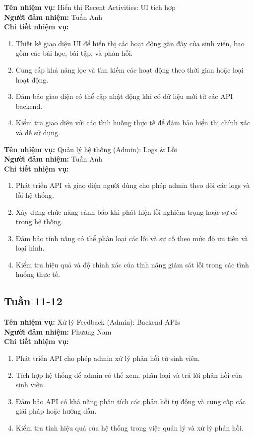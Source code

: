 \noindent \textbf{Tên nhiệm vụ:} Hiển thị Recent Activities: UI tích hợp \\
\noindent \textbf{Người đảm nhiệm:} Tuấn Anh \\
\noindent \textbf{Chi tiết nhiệm vụ:} 
\begin{enumerate}[label=-]
    \item Thiết kế giao diện UI để hiển thị các hoạt động gần đây của sinh viên, bao gồm các bài học, bài tập, và phản hồi. 
    \item Cung cấp khả năng lọc và tìm kiếm các hoạt động theo thời gian hoặc loại hoạt động. 
    \item Đảm bảo giao diện có thể cập nhật động khi có dữ liệu mới từ các API backend. 
    \item Kiểm tra giao diện với các tình huống thực tế để đảm bảo hiển thị chính xác và dễ sử dụng.
\end{enumerate}

\noindent \textbf{Tên nhiệm vụ:} Quản lý hệ thống (Admin): Logs \& Lỗi \\
\noindent \textbf{Người đảm nhiệm:} Tuấn Anh \\
\noindent \textbf{Chi tiết nhiệm vụ:} 
\begin{enumerate}[label=-]
    \item Phát triển API và giao diện người dùng cho phép admin theo dõi các logs và lỗi hệ thống. 
    \item Xây dựng chức năng cảnh báo khi phát hiện lỗi nghiêm trọng hoặc sự cố trong hệ thống. 
    \item Đảm bảo tính năng có thể phân loại các lỗi và sự cố theo mức độ ưu tiên và loại hình. 
    \item Kiểm tra hiệu quả và độ chính xác của tính năng giám sát lỗi trong các tình huống thực tế.
\end{enumerate}

\subsection*{Tuần 11-12}

\noindent \textbf{Tên nhiệm vụ:} Xử lý Feedback (Admin): Backend APIs \\
\noindent \textbf{Người đảm nhiệm:} Phương Nam \\
\noindent \textbf{Chi tiết nhiệm vụ:} 
\begin{enumerate}[label=-]
    \item Phát triển API cho phép admin xử lý phản hồi từ sinh viên. 
    \item Tích hợp hệ thống để admin có thể xem, phân loại và trả lời phản hồi của sinh viên. 
    \item Đảm bảo API có khả năng phân tích các phản hồi tự động và cung cấp các giải pháp hoặc hướng dẫn. 
    \item Kiểm tra tính hiệu quả của hệ thống trong việc quản lý và xử lý phản hồi.
\end{enumerate}

